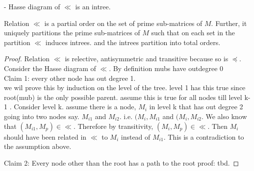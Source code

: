 \documentclass{llncs}
\def\cD{{\cal D}}
\def\cE{{\cal E}}
\begin{document}
- Hasse diagram of $\ll$ is an intree.


\begin{theorem} \label{thm:partition}
Relation $\ll$ is a partial order on the set of prime sub-matrices of $M$.
Further, it uniquely partitions the prime sub-matrices of $M$ such
that on each set in the partition $\ll$ induces intrees. and the
intrees partition into total orders.
\end{theorem}
\begin{proof}
  Relation $\ll$ is relective, antisymmetric and transitive because so
  is $\preccurlyeq$.  Consider the Hasse diagram of $\ll$. By
  definition mubs have outdegree
  0 \\
  Claim 1: every other node has out degree 1.\\
  we wil prove this by induction on the level of the tree. level 1 has
  this true since root(mub) is the only possible parent. assume this
  is true for all nodes till level k-1 . Consider level k. assume
  there is a node, $M_i$ in level k that has out degree 2 going into
  two nodes say. $M_{i1}$ and $M_{i2}$. i.e. $(M_i, M_{i1}$ and $(M_i,
  M_{i2}$. We also know that $(M_{i1}, M_p) \in \ll$. Therefore by
  transitivity, $ (M_i, M_p) \in \ll$. Then $M_i$ should have been
  related in $\ll$ to $M_{i}$ instead of $M_{i1}$. This is a
  contradiction to the assumption above.

Claim 2: Every node other than the root has a path to the root
proof: tbd.




\end{proof}
\end{document}
